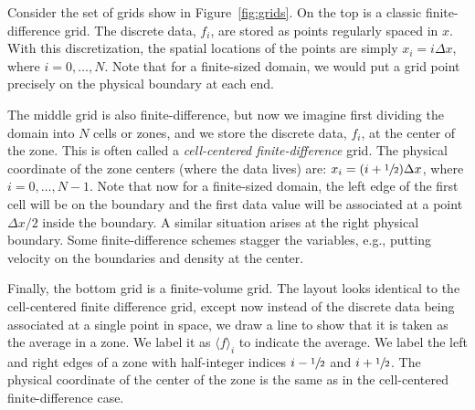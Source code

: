Consider the set of grids show in Figure~\ref{fig:grids}.  On the top
is a classic finite-difference grid.  The discrete data, $f_i$, are
stored as points regularly spaced in $x$.  With this discretization,
the spatial locations of the points are simply $x_i = i \Delta x$,
where $i = 0, \ldots, N$.  Note that for a finite-sized domain, we
would put a grid point precisely on the physical boundary at each end.

The middle grid is also finite-difference, but now we imagine first
dividing the domain into $N$ cells or zones, and we store the discrete
data, $f_i$, at the center of the zone.  This is often called a {\em
  cell-centered finite-difference} grid.  The physical coordinate of
the zone centers (where the data lives) are: $x_i = (i + \sfrac{1}{2})\Delta
x$, where $i = 0, \ldots, N-1$.  Note that now for a finite-sized
domain, the left edge of the first cell will be on the boundary and
the first data value will be associated at a point $\Delta x/2$ inside
the boundary.  A similar situation arises at the right physical
boundary.  Some finite-difference schemes stagger the variables,
e.g., putting velocity on the boundaries and density at the center.

Finally, the bottom grid is a finite-volume grid.  The layout looks
identical to the cell-centered finite difference grid, except now
instead of the discrete data being associated at a single point in
space, we draw a line to show that it is taken as the average in a
zone.  We label it as $\langle f\rangle_i$ to indicate the average.
We label the left and right edges of a zone with half-integer indices
$i-\sfrac{1}{2}$ and $i+\sfrac{1}{2}$.  The physical coordinate of the center of the zone
is the same as in the cell-centered finite-difference case.


